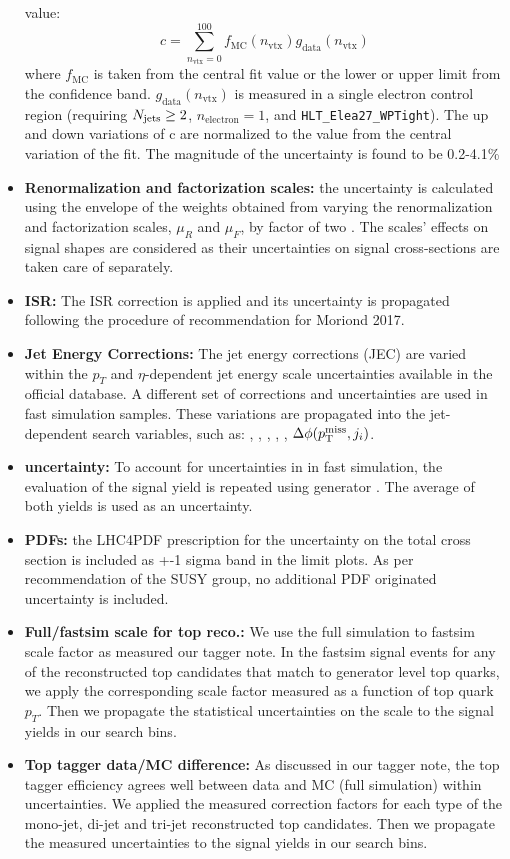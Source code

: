 \begin{itemize}
value:
\begin{equation}
c = \sum_{n_{\text{vtx}}=0}^{100} f_{\text{MC}}(n_{\text{vtx}})g_{\text{data}}(n_{\text{vtx}}) \label{eq:puacc-expval}
\end{equation}
where $f_{\text{MC}}$ is taken from the central fit value or the lower or upper limit from the confidence band.
$g_{\text{data}}(n_{\text{vtx}})$ is measured in a single electron control region (requiring $N_{\text{jets}}\geq2$, $n_{\text{electron}}=1$, and \texttt{HLT\_Elea27\_WPTight}).
The up and down variations of c are normalized to the value from the central variation of the fit. The magnitude of the uncertainty is found to be 0.2-4.1\%
\item {\bf Renormalization and factorization scales:} the uncertainty is calculated using the envelope of the weights obtained from varying the renormalization and factorization scales, $\mu_{R}$ and $\mu_{F}$, by factor of two \cite{Cacciari:2003fi,Catani:2003zt}. The scales' effects on signal shapes are considered as their uncertainties on signal cross-sections are taken care of separately. %
\item {\bf ISR:} The ISR correction is applied and its uncertainty is propagated following the procedure of recommendation for Moriond 2017.
\item {\bf Jet Energy Corrections:} The jet energy corrections (JEC) are varied within the $p_{T}$ and $\eta$-dependent jet energy scale uncertainties available in the official database. A different set of corrections and uncertainties are used in fast simulation samples.  These variations are propagated into the jet-dependent search variables, such as: \nbjets, \ntops, \MET, \MTTwo, \HT, $\Delta\phi(p^{\rm miss}_{\rm T},j_{i})$.
\item {\bf \MET uncertainty:} To account for uncertainties in \MET in fast simulation, the evaluation of the signal yield is repeated using generator \MET. The average of both yields is used as an uncertainty.
\item {\bf PDFs:} the LHC4PDF prescription for the uncertainty on the total cross section is included as +-1 sigma band in the limit plots. As per recommendation of the SUSY group, no additional PDF originated uncertainty is included.
\item {\bf Full/fastsim scale for top reco.:} We use the full simulation to fastsim scale factor as measured our tagger note. In the fastsim signal events for any of the reconstructed top candidates that match to generator level top quarks, we apply the corresponding scale factor measured as a function of top quark $p_{T}$. Then we propagate the statistical uncertainties on the scale to the signal yields in our search bins.
\item {\bf Top tagger data/MC difference:} As discussed in our tagger note, the top tagger efficiency agrees well between data and MC (full simulation) within uncertainties. We applied the measured correction factors for each type of the mono-jet, di-jet and tri-jet reconstructed top candidates. Then we propagate the measured uncertainties to the signal yields in our search bins.
\end{itemize}

